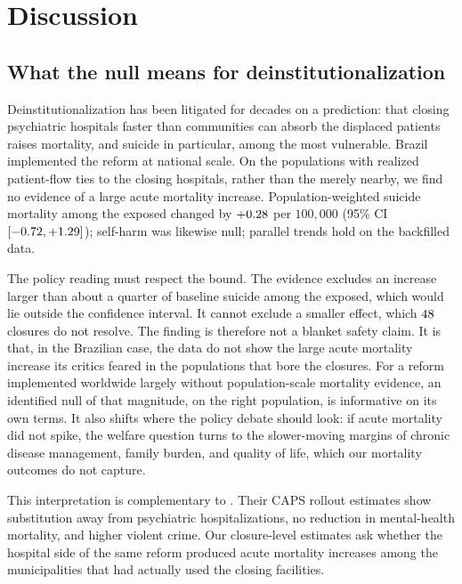 \section{Discussion}
\label{sec:discussion}

\subsection{What the null means for deinstitutionalization}
\label{sec:discussion-policy}

Deinstitutionalization has been litigated for decades on a prediction:
that closing psychiatric hospitals faster than communities can absorb
the displaced patients raises mortality, and suicide in particular,
among the most vulnerable. Brazil implemented the reform at national
scale. On the populations with realized patient-flow ties to the closing
hospitals, rather than the merely nearby, we find no evidence of a large
acute mortality increase. Population-weighted suicide mortality among
the exposed changed by $+0.28$ per $100{,}000$
(95\% CI $[-0.72, +1.29]$); self-harm was likewise null; parallel trends
hold on the backfilled data.

The policy reading must respect the bound. The evidence excludes an
increase larger than about a quarter of baseline suicide among the
exposed, which would lie outside the confidence interval. It cannot
exclude a smaller effect, which $48$ closures do not
resolve. The finding is therefore not a blanket safety claim. It is that,
in the Brazilian case, the data do not show the large acute mortality
increase its critics feared in the populations that bore the closures.
For a reform implemented worldwide largely without
population-scale mortality evidence, an identified null of that
magnitude, on the right population, is informative on its own terms. It
also shifts where the policy debate should look: if acute mortality did
not spike, the welfare question turns to the slower-moving margins of
chronic disease management, family burden, and quality of life, which
our mortality outcomes do not capture.

This interpretation is complementary to \citet{diasFontes2024}. Their
CAPS rollout estimates show substitution away from psychiatric
hospitalizations, no reduction in mental-health mortality, and higher
violent crime. Our closure-level estimates ask whether the hospital
side of the same reform produced acute mortality increases among the
municipalities that had actually used the closing facilities.

